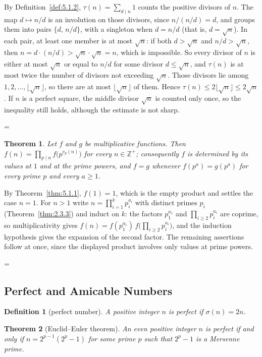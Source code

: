 \documentclass[11pt]{article}
\makeatletter
\theoremstyle{ntstyle}
\newtheorem{theorem}{Theorem}[subsection]
\newtheorem{definition}{Definition}[subsection]
\let\nt@closedisplay\]
\def\nt@guardedclose{\@ifnextchar\par{\nt@closeafterpar}{\@ifnextchar\end{\postdisplaypenalty\@M\nt@closedisplay}{\nt@closedisplay}}}
\def\nt@closeafterpar\par{\@ifnextchar\par{\nt@closeafterpar}{\@ifnextchar\end{\postdisplaypenalty\@M\nt@closedisplay\par}{\nt@closedisplay\par}}}
\renewenvironment{proof}[1][\proofname]{\par
  \pushQED{\qed}\normalfont\topsep\medskipamount\edef\nt@afterproof{\@endparpenalty=\the\@endparpenalty\relax}\@beginparpenalty\@M\@endparpenalty\@M\let\]\nt@guardedclose\trivlist\item[]\textit{#1\@addpunct{.}} \ignorespaces}{\ifvmode\addpenalty\@M\fi\popQED\nt@afterproof\endtrivlist\@endpefalse}
\makeatother
\begin{document}
\begin{proof} By Definition~\ref{def:5.1.2}, $\tau(n)=\sum_{d\mid n}1$
	counts the positive divisors of $n$. The map
	$d\mapsto n/d$ is an involution on those divisors, since $n/(n/d)=d$,
	and groups them into
	pairs $\{d,\,n/d\}$, with a singleton when $d=n/d$ (that is, $d=\sqrt{n}$).
	In each pair, at least one member is
	at most $\sqrt{n}$: if both $d>\sqrt{n}$ and $n/d>\sqrt{n}$, then $n=d\cdot(n/d)>\sqrt{n}\cdot\sqrt{n}=n$,
	which is impossible. So every divisor of $n$ is either at most $\sqrt{n}$ or
	equal to $n/d$ for some divisor $d\le\sqrt{n}$, and $\tau(n)$ is at most twice the number of divisors not exceeding $\sqrt{n}$. Those divisors lie among $1,2,\ldots,\lfloor\sqrt{n}\rfloor$, so there are at most $\lfloor\sqrt{n}\rfloor$ of them.
	Hence $\tau(n)\le 2\lfloor\sqrt{n}\rfloor\le 2\sqrt{n}$. If $n$
	is a perfect square, the middle divisor $\sqrt n$ is counted only once,
	so the inequality still holds, although the estimate is not sharp.

\end{proof}
\begin{theorem}\label{thm:5.1.10} Let $f$ and $g$ be multiplicative
	functions. Then $f(n)=\prod_{p\mid n}f\bigl(p^{v_p(n)}\bigr)$ for every
	$n\in\mathbb{Z}^+$; consequently $f$ is determined by its values at $1$ and
	at the prime powers, and $f=g$ whenever $f(p^{a})=g(p^{a})$ for every prime $p$ and every $a\ge1$.

\end{theorem}

\begin{proof} By Theorem~\ref{thm:5.1.1}, $f(1)=1$, which is the
	empty product and settles the case $n=1$. For $n>1$ write
	$n=\prod_{i=1}^{k}p_i^{a_i}$ with distinct primes $p_i$
	(Theorem~\ref{thm:2.3.3}) and induct on $k$: the factors $p_1^{a_1}$ and
	$\prod_{i\ge2}p_i^{a_i}$ are coprime, so multiplicativity gives
	$f(n)=f(p_1^{a_1})\,f\big(\prod_{i\ge2}p_i^{a_i}\big)$, and the induction
	hypothesis gives the expansion of the second factor. The remaining assertions follow at
	once, since the displayed product involves only values at prime powers.

\end{proof}
\subsection{Perfect and Amicable Numbers}

\begin{definition}[perfect number]\label{def:5.2.1}
	A positive integer $n$ is perfect if $\sigma(n) = 2n$.

\end{definition}
\begin{theorem}[Euclid--Euler theorem]\label{thm:5.2.1} An even positive integer
	$n$ is perfect if and only if
	$n = 2^{p-1}(2^{p}-1)$ for some prime $p$ such that $2^{p}-1$ is a Mersenne prime.

\end{theorem}
\end{document}
